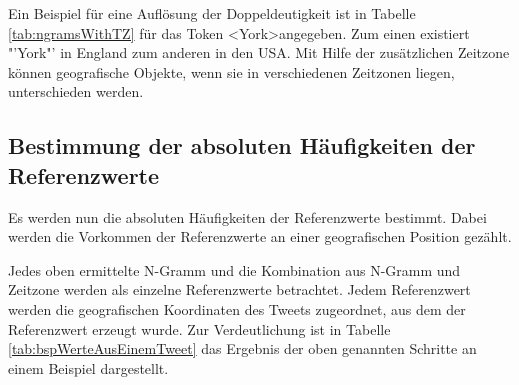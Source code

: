 					Ein Beispiel für eine Auflösung der Doppeldeutigkeit ist in Tabelle \ref{tab:ngramsWithTZ} für das Token \textless York\textgreater  angegeben.
					Zum einen existiert "'York"' in England zum anderen in den USA.  
					Mit Hilfe der zusätzlichen Zeitzone können geografische Objekte, wenn sie in verschiedenen Zeitzonen liegen, unterschieden werden.

		\subsection{Bestimmung der absoluten Häufigkeiten der Referenzwerte}

			Es werden nun die absoluten Häufigkeiten der Referenzwerte bestimmt.
			Dabei werden die Vorkommen der Referenzwerte an einer geografischen Position gezählt.

			Jedes oben ermittelte N-Gramm und die Kombination aus N-Gramm und Zeitzone werden als einzelne Referenzwerte betrachtet. 
			Jedem Referenzwert werden die geografischen Koordinaten des Tweets zugeordnet, aus dem der Referenzwert erzeugt wurde.
			Zur Verdeutlichung ist in Tabelle \ref{tab:bspWerteAusEinemTweet} das Ergebnis der oben genannten Schritte an einem Beispiel dargestellt. 

